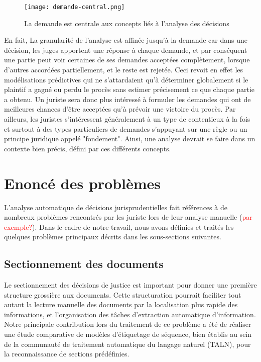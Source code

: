 \begin{figure}[h]
    \centering
    \texttt{[image: demande-central.png]}
    \caption{La demande est centrale aux concepts liés à l'analyse des décisions}
    \label{fig:intro:demande-central}
\end{figure}

En fait, La granularité de l'analyse est affinée jusqu'à la demande car dans une décision, les juges apportent une réponse à chaque demande, et par conséquent une partie peut voir certaines de ses demandes acceptées complètement, lorsque d'autres accordées partiellement, et le reste est rejetée.  Ceci revoit en effet les modélisations prédictives qui ne s'attardaient qu'à déterminer globalement si le plaintif a  gagné ou perdu le procès sans estimer précisement ce que chaque partie a obtenu. Un juriste sera donc plus intéressé à formuler les demandes qui ont de meilleures chances d'être acceptées qu'à prévoir une victoire du procès. Par ailleurs, les juristes s'intéressent généralement à un type de contentieux à la fois et surtout à des types particuliers de demandes s'appuyant sur une règle ou un principe juridique appelé "fondement". Ainsi, une analyse devrait se faire dans un contexte bien précis, défini par ces différents concepts.


\section{Enoncé des problèmes}
\label{sec:intro:probleme}
L'analyse automatique de décisions jurisprudentielles fait références à de nombreux problèmes rencontrés par les juriste lors de leur analyse manuelle (\textcolor{red}{par exemple?}). Dans le cadre de notre travail, nous avons définies et traités les quelques problèmes principaux décrits dans les sous-sections suivantes.
\subsection{Sectionnement des documents}
Le sectionnement des décisions de justice est important pour donner une première structure grossière aux documents. Cette structuration pourrait faciliter tout autant la lecture manuelle des documents par la localisation plus rapide des informations, et l'organisation des tâches d'extraction automatique d'information. Notre principale contribution lors du traitement de ce problème a été de réaliser une étude comparative de modèles d'étiquetage de séquence, bien établis au sein de la communauté de traitement automatique du langage naturel (TALN),  pour la reconnaissance de sections prédéfinies. 

